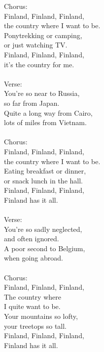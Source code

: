 
            Chorus: \\
            Finland, Finland, Finland, \\
            the country where I want to be. \\
            Ponytrekking or camping, \\
            or just watching TV. \\
            Finland, Finland, Finland, \\
            it’s the country for me. \\
\hspace{10mm} \\
            Verse: \\
            You’re so near to Russia, \\
            so far from Japan. \\
            Quite a long way from Cairo, \\
            lots of miles from Vietnam. \\
\hspace{10mm} \\
            Chorus: \\
            Finland, Finland, Finland, \\
            the country where I want to be. \\
            Eating breakfast or dinner, \\
            or snack lunch in the hall. \\
            Finland, Finland, Finland, \\
            Finland has it all. \\
\hspace{10mm} \\
            Verse: \\
            You’re so sadly neglected, \\
            and often ignored. \\
            A poor second to Belgium, \\
            when going abroad. \\
\hspace{10mm} \\
            Chorus: \\
            Finland, Finland, Finland, \\
            The country where \\
            I quite want to be. \\
            Your mountains so lofty, \\
            your treetops so tall. \\
            Finland, Finland, Finland, \\
            Finland has it all. \\
